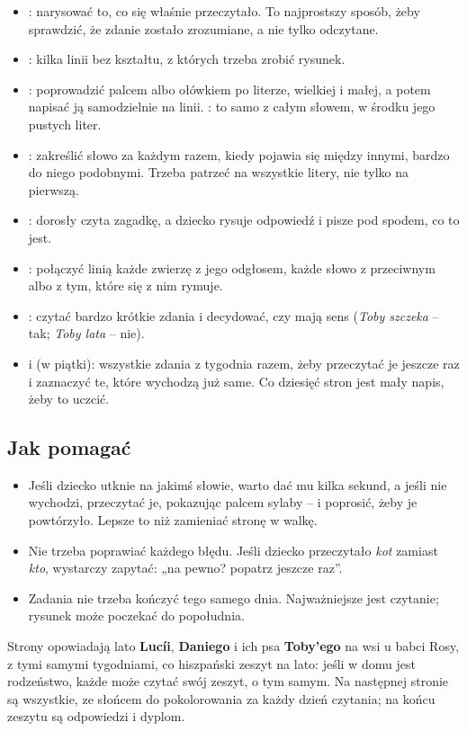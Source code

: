{\small
\begin{itemize}[leftmargin=6mm, itemsep=1pt, topsep=2pt]
\item \textbf{\lblDibuja}: narysować to, co się właśnie przeczytało. To
  najprostszy sposób, żeby sprawdzić, że zdanie zostało zrozumiane, a
  nie tylko odczytane.
\item \textbf{\lblCompleta}: kilka linii bez kształtu, z których trzeba
  zrobić rysunek.
\item \textbf{\lblTraza}: poprowadzić palcem albo ołówkiem po literze,
  wielkiej i małej, a potem napisać ją samodzielnie na linii.
  \textbf{\lblEscribe}: to samo z całym słowem, w środku jego pustych
  liter.
\item \textbf{\lblEncuentra}: zakreślić słowo za każdym razem, kiedy
  pojawia się między innymi, bardzo do niego podobnymi. Trzeba patrzeć
  na wszystkie litery, nie tylko na pierwszą.
\item \textbf{\lblAdivina}: dorosły czyta zagadkę, a dziecko rysuje
  odpowiedź i pisze pod spodem, co to jest.
\item \textbf{\lblUne}: połączyć linią każde zwierzę z jego odgłosem,
  każde słowo z przeciwnym albo z tym, które się z nim rymuje.
\item \textbf{\lblSiNo}: czytać bardzo krótkie zdania i decydować, czy
  mają sens (\emph{Toby szczeka} -- tak; \emph{Toby lata} -- nie).
\item \textbf{\lblRelee} i \textbf{\lblRepasa} (w piątki): wszystkie
  zdania z tygodnia razem, żeby przeczytać je jeszcze raz i zaznaczyć
  te, które wychodzą już same. Co dziesięć stron jest mały napis, żeby
  to uczcić.
\end{itemize}}

\subsection*{Jak pomagać}

{\small
\begin{itemize}[leftmargin=6mm, itemsep=1pt, topsep=2pt]
\item Jeśli dziecko utknie na jakimś słowie, warto dać mu kilka sekund,
  a jeśli nie wychodzi, przeczytać je, pokazując palcem sylaby -- i
  poprosić, żeby je powtórzyło. Lepsze to niż zamieniać stronę w walkę.
\item Nie trzeba poprawiać każdego błędu. Jeśli dziecko przeczytało
  \emph{kot} zamiast \emph{kto}, wystarczy zapytać: „na pewno? popatrz
  jeszcze raz”.
\item Zadania nie trzeba kończyć tego samego dnia. Najważniejsze jest
  czytanie; rysunek może poczekać do popołudnia.
\end{itemize}}

Strony opowiadają lato \textbf{Lucíi}, \textbf{Daniego} i ich psa
\textbf{Toby'ego} na wsi u babci Rosy, z tymi samymi tygodniami, co
hiszpański zeszyt na lato: jeśli w domu jest rodzeństwo, każde może
czytać swój zeszyt, o tym samym. Na następnej stronie są wszystkie, ze
słońcem do pokolorowania za każdy dzień czytania; na końcu zeszytu są
odpowiedzi i dyplom.
\newpage
